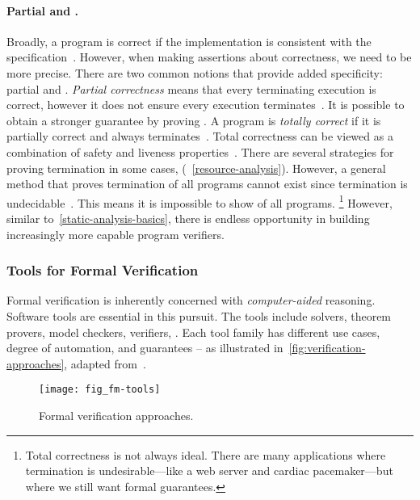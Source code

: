 \paragraph*{Partial and .}
Broadly, a program is correct if the implementation is consistent with the
specification~\cite{furia2014b}. However, when making
assertions about correctness, we need to be more precise. There are two common
notions that provide added specificity: partial and
. \emph{Partial correctness}
means that every terminating execution is correct, however it does not ensure
every execution terminates~\cite[p. 64]{leino2023}. It is possible to obtain a
stronger guarantee by proving . A program is
\emph{totally correct} if it is partially correct and always terminates~\cite[p.
64]{leino2023}. Total correctness can be viewed as a
combination of safety and liveness
properties~\cite{lamport1977}. There are several
strategies for proving termination in some cases,
(\cf~\autoref{resource-analysis}). However, a general method that proves
termination of all programs cannot exist since termination is
undecidable~\cite{turing1936}. This means it is impossible
to show  of all programs. \footnote{Total
correctness is not always ideal. There are many
applications where termination is undesirable---like a web server and cardiac
pacemaker---but where we still want formal guarantees.} However, similar
to~\autoref{static-analysis-basics}, there is endless opportunity in building
increasingly more capable program verifiers.

\subsubsection{Tools for Formal Verification}

Formal verification is inherently concerned with
\emph{computer-aided} reasoning. Software tools are essential in this pursuit.
The tools include solvers, theorem provers, model checkers, verifiers, \etc.
Each tool family has different use cases, degree of automation, and guarantees
-- as illustrated in~\autoref{fig:verification-approaches}, adapted
from~\textcite{leroy2018}.

\begin{figure}[ht]
\centering
\texttt{[image: fig\_fm-tools]}
\caption[Formal verification approaches]{
Formal verification approaches.}
\label{fig:verification-approaches}
\end{figure}

